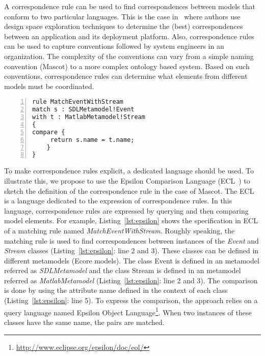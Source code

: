 {%
A correspondence rule can be used to find correspondences between models that conform to two particular languages. This is the case in~\cite{kofmanbib} where authors use design space exploration techniques to determine the (best) correspondences between an application and its deployment platform. Also, correspondence rules can be used to capture conventions followed by system engineers in an organization. The complexity of the conventions can vary from a simple naming convention (\eg Mascot) to a more complex ontology based system. Based on such conventions, correspondence rules can determine what elements from different models must be coordinated.    

\begin{lstlisting}[language=epsilon, caption={Specification of the Mascot correspondence rule by using the Epsilon Comparison Language}, label={lst:epsilon}, 	basicstyle=\scriptsize\ttfamily, backgroundcolor=\color{LGrey}, numbers=left, xleftmargin=2pt]
rule MatchEventWithStream
match s : SDLMetamodel!Event
with t : MatlabMetamodel!Stream 
{
compare {
	 return s.name = t.name;
	}
}
\end{lstlisting}

To make correspondence rules explicit, a dedicated language should be used. To illustrate this, we propose to use the Epsilon Comparison Language (ECL~\cite{epsilonbib}) to sketch the definition of the correspondence rule in the case of Mascot. The ECL is a language dedicated to the expression of correspondence rules. In this language, correspondence rules are expressed by querying and then comparing model elements. For example, Listing~\ref{lst:epsilon} shows the specification in ECL of a matching rule named \emph{MatchEventWithStream}. Roughly speaking, the matching rule is used to find correspondences between instances of the \emph{Event} and \emph{Stream} classes (Listing~\ref{lst:epsilon}: line 2 and 3). These classes can be defined in different metamodels (\ie Ecore models). The class Event is defined in an metamodel referred as \emph{SDLMetamodel} and the class Stream is defined in an metamodel referred as \emph{MatlabMetamodel} (Listing~\ref{lst:epsilon}: line 2 and 3). The comparison is done by using the attribute name defined in the context of each class (Listing~\ref{lst:epsilon}: line 5). To express the comparison, the approach relies on a query language named Epsilon Object Language\footnote{\url{http://www.eclipse.org/epsilon/doc/eol/}}. When two instances of these classes have the same name, the pairs are matched.

}
